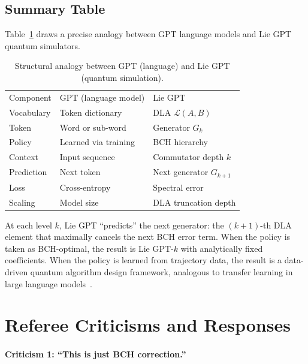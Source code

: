 \documentclass[aps,prxquantum,twocolumn,nofootinbib]{revtex4-2}
\begin{document}
\subsection{Summary Table}

Table~\ref{tab:ml-analogy} draws a precise analogy between GPT
language models and Lie GPT quantum simulators.

\begin{table}[h]
  \caption{Structural analogy between GPT (language) and Lie GPT (quantum simulation).}
  \label{tab:ml-analogy}
  \begin{ruledtabular}
    \small
    \begin{tabular}{lll}
      Component & GPT (language model) & Lie GPT \\
      \colrule
      Vocabulary & Token dictionary & DLA $\mathcal{L}(A,B)$ \\
      Token & Word or sub-word & Generator $G_k$ \\
      Policy & Learned via training & BCH hierarchy \\
      Context & Input sequence & Commutator depth $k$ \\
      Prediction & Next token & Next generator $G_{k+1}$ \\
      Loss & Cross-entropy & Spectral error \\
      Scaling & Model size & DLA truncation depth \\
    \end{tabular}
  \end{ruledtabular}
\end{table}

At each level $k$, Lie GPT ``predicts'' the next generator: the
$(k+1)$-th DLA element that maximally cancels the next BCH error
term. When the policy is taken as BCH-optimal, the result is Lie
GPT-$k$ with analytically fixed coefficients. When the policy is
learned from trajectory data, the result is a data-driven quantum
algorithm design framework, analogous to transfer learning in
large language models~\cite{nips_yangrdwy24,nips_ma0lj024}.

\section{Referee Criticisms and Responses}
\label{sec:defense}

\paragraph{Criticism 1: ``This is just BCH correction.''}
\end{document}
